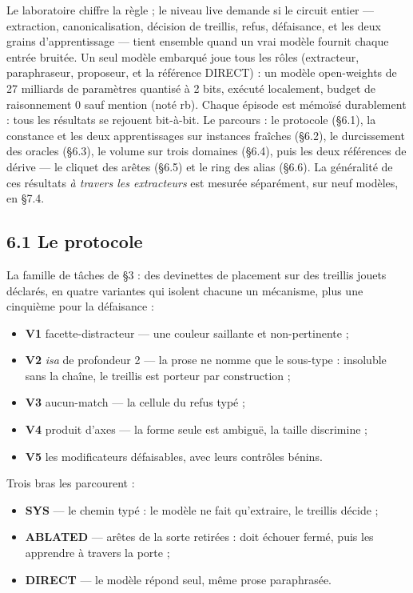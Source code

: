 \documentclass[11pt]{article}
\begin{document}
Le laboratoire chiffre la règle ; le niveau live demande si le circuit entier — extraction, canonicalisation, décision de treillis, refus, défaisance, et les deux grains d'apprentissage — tient ensemble quand un vrai modèle fournit chaque entrée bruitée. Un seul modèle embarqué joue tous les rôles (extracteur, paraphraseur, proposeur, et la référence DIRECT) : un modèle open-weights de 27 milliards de paramètres quantisé à 2 bits, exécuté localement, budget de raisonnement 0 sauf mention (noté rb). Chaque épisode est mémoïsé durablement : tous les résultats se rejouent bit-à-bit. Le parcours : le protocole (§6.1), la constance et les deux apprentissages sur instances fraîches (§6.2), le durcissement des oracles (§6.3), le volume sur trois domaines (§6.4), puis les deux références de dérive — le cliquet des arêtes (§6.5) et le ring des alias (§6.6). La généralité de ces résultats \emph{à travers les extracteurs} est mesurée séparément, sur neuf modèles, en §7.4.

\subsection*{6.1 Le protocole}

La famille de tâches de §3 : des devinettes de placement sur des treillis jouets déclarés, en quatre variantes qui isolent chacune un mécanisme, plus une cinquième pour la défaisance :

\begin{itemize}
\item \textbf{V1} facette-distracteur — une couleur saillante et non-pertinente ;
\item \textbf{V2} \emph{isa} de profondeur 2 — la prose ne nomme que le sous-type : insoluble sans la chaîne, le treillis est porteur par construction ;
\item \textbf{V3} aucun-match — la cellule du refus typé ;
\item \textbf{V4} produit d'axes — la forme seule est ambiguë, la taille discrimine ;
\item \textbf{V5} les modificateurs défaisables, avec leurs contrôles bénins.
\end{itemize}

Trois bras les parcourent :

\begin{itemize}
\item \textbf{SYS} — le chemin typé : le modèle ne fait qu'extraire, le treillis décide ;
\item \textbf{ABLATED} — arêtes de la sorte retirées : doit échouer fermé, puis les apprendre à travers la porte ;
\item \textbf{DIRECT} — le modèle répond seul, même prose paraphrasée.
\end{itemize}
\end{document}
